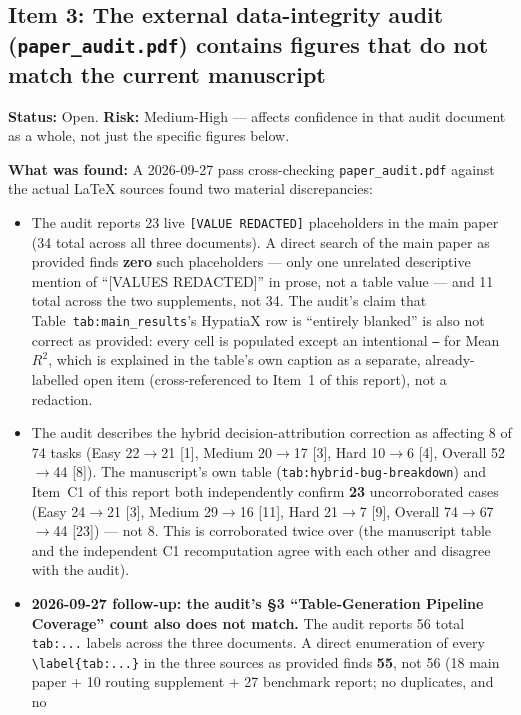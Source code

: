 \documentclass[11pt]{article}
\newcommand{\Rsq}{R^{2}}
\begin{document}
\subsection*{Item 3: The external data-integrity audit
(\texttt{paper\_audit.pdf}) contains figures that do not match the
current manuscript}
\textbf{Status:} Open. \textbf{Risk:} Medium-High — affects confidence in
that audit document as a whole, not just the specific figures below.

\textbf{What was found:} A 2026-09-27 pass cross-checking
\texttt{paper\_audit.pdf} against the actual \LaTeX{} sources found two
material discrepancies:
\begin{itemize}
  \item The audit reports 23 live \texttt{[VALUE REDACTED]} placeholders
    in the main paper (34 total across all three documents). A direct
    search of the main paper as provided finds \textbf{zero} such
    placeholders — only one unrelated descriptive mention of
    ``[VALUES REDACTED]'' in prose, not a table value — and 11 total
    across the two supplements, not 34. The audit's claim that
    Table~\texttt{tab:main\_results}'s HypatiaX row is ``entirely
    blanked'' is also not correct as provided: every cell is populated
    except an intentional \texttt{---} for Mean~$\Rsq$, which is
    explained in the table's own caption as a separate, already-labelled
    open item (cross-referenced to Item~1 of this report), not a
    redaction.
  \item The audit describes the hybrid decision-attribution correction
    as affecting 8 of 74 tasks (Easy 22$\to$21 [1], Medium 20$\to$17 [3],
    Hard 10$\to$6 [4], Overall 52$\to$44 [8]). The manuscript's own
    table (\texttt{tab:hybrid-bug-breakdown}) and Item~C1 of this report
    both independently confirm \textbf{23} uncorroborated cases (Easy
    24$\to$21 [3], Medium 29$\to$16 [11], Hard 21$\to$7 [9], Overall
    74$\to$67$\to$44 [23]) — not 8. This is corroborated twice over (the
    manuscript table and the independent C1 recomputation agree with
    each other and disagree with the audit).
  \item \textbf{2026-09-27 follow-up: the audit's \S3 ``Table-Generation
    Pipeline Coverage'' count also does not match.} The audit reports 56
    total \texttt{tab:...} labels across the three documents. A direct
    enumeration of every \texttt{\textbackslash label\{tab:...\}} in the
    three sources as provided finds \textbf{55}, not 56 (18 main paper +
    10 routing supplement + 27 benchmark report; no duplicates, and no

\end{itemize}
\end{document}
